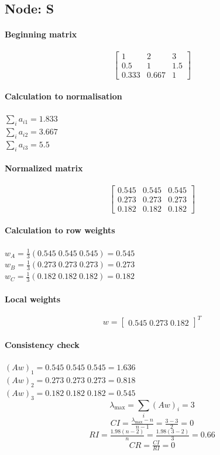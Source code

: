 \documentclass[11pt]{article}
\begin{document}
\subsection*{Node: S}
\paragraph{Beginning matrix}
\[\begin{bmatrix}
1 & 2 & 3 \\
0.5 & 1 & 1.5 \\
0.333 & 0.667 & 1
\end{bmatrix}\]
\paragraph{Calculation to normalisation}
\(\sum_i a_{i1} = 1.833\) \\ \(\sum_i a_{i2} = 3.667\) \\ \(\sum_i a_{i3} = 5.5\)
\paragraph{Normalized matrix}
\[\begin{bmatrix}
0.545 & 0.545 & 0.545 \\
0.273 & 0.273 & 0.273 \\
0.182 & 0.182 & 0.182
\end{bmatrix}\]
\paragraph{Calculation to row weights}
\(w_{A} = \tfrac{1}{3}(0.545 \; 0.545 \; 0.545) = 0.545\) \\ \(w_{B} = \tfrac{1}{3}(0.273 \; 0.273 \; 0.273) = 0.273\) \\ \(w_{C} = \tfrac{1}{3}(0.182 \; 0.182 \; 0.182) = 0.182\)
\paragraph{Local weights}
\[w = \begin{bmatrix} 0.545 \; 0.273 \; 0.182 \end{bmatrix}^{\!T}\]
\paragraph{Consistency check}
\((Aw)_{1} = 0.545 \; 0.545 \; 0.545 = 1.636\) \\ \((Aw)_{2} = 0.273 \; 0.273 \; 0.273 = 0.818\) \\ \((Aw)_{3} = 0.182 \; 0.182 \; 0.182 = 0.545\)
\[\lambda_{\max} = \sum_i (Aw)_i = 3\]
\[CI = \tfrac{\lambda_{\max}-n}{n-1} = \tfrac{3 - 3}{2} = 0\]
\[RI = \tfrac{1.98(n-2)}{n} = \tfrac{1.98(3-2)}{3} = 0.66\]
\[CR = \tfrac{CI}{RI} = 0\]
\end{document}
